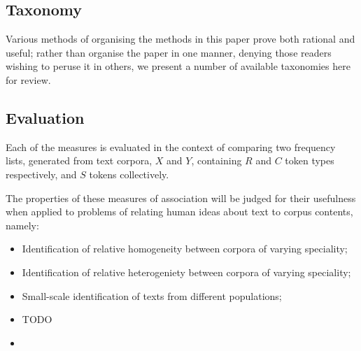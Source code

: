 \documentclass[11pt]{article}
\begin{document}






\subsection{Taxonomy}
Various methods of organising the methods in this paper prove both rational and useful; rather than organise the paper in one manner, denying those readers wishing to peruse it in others, we present a number of available taxonomies here for review.




\subsection{Evaluation}
Each of the measures is evaluated in the context of comparing two frequency lists, generated from text corpora, $X$ and $Y$, containing $R$ and $C$ token types respectively, and $S$ tokens collectively.

The properties of these measures of association will be judged for their usefulness when applied to problems of relating human ideas about text to corpus contents, namely:
\begin{itemize}
    \item Identification of relative homogeneity between corpora of varying speciality;
    \item Identification of relative heterogeniety between corpora of varying speciality;
    \item Small-scale identification of texts from different populations;
    \item TODO
    \item 
\end{itemize}
\end{document}
